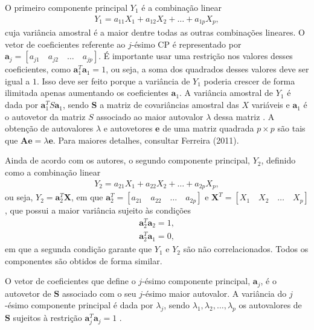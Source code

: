 \documentclass[12pt,a4paper]{article}
\begin{document}
O primeiro componente principal $Y_1$ é a combinação linear
\begin{align*}
	Y_1 = a_{11}X_1 + a_{12}X_2 + \dots + a_{1p}X_p,
\end{align*}
cuja variância amostral é a maior dentre todas as outras combinações lineares. O vetor de coeficientes referente ao $j$-ésimo CP é representado por $\boldsymbol{a}_j= [a_{j1} \quad a_{j2} \quad \dots \quad a_{jp}]$. É importante usar uma restrição nos valores desses coeficientes, como $\boldsymbol{a}_1^T\boldsymbol{a}_1 = 1$, ou seja, a soma dos quadrados desses valores deve ser igual a $1$. Isso deve ser feito porque a variância de $Y_1$ poderia crescer de forma ilimitada apenas aumentando os coeficientes $\boldsymbol{a}_1$. A variância amostral de $Y_1$ é dada por $\boldsymbol{a}_1^T S\boldsymbol{a}_1$, sendo $\boldsymbol{S}$ a matriz de covariâncias amostral das $X$ variáveis e $\boldsymbol{a}_1$ é o autovetor da matriz $S$ associado ao maior autovalor $\lambda$ dessa matriz \cite{everitt11}. A obtenção de autovalores $\lambda$ e autovetores $\boldsymbol{e}$ de uma matriz quadrada $p \times p$ são tais que $\boldsymbol{A}\boldsymbol{e} = \lambda\boldsymbol{e}$. Para maiores detalhes, consultar Ferreira (2011).
	
Ainda de acordo com os autores, o segundo componente principal, $Y_2$, definido como a combinação linear
\begin{align*}
	Y_2 = a_{21}X_1 + a_{22}X_2 + \dots + a_{2p}X_p,
\end{align*}
ou seja, $Y_2 = \boldsymbol{a}_2^T\boldsymbol{X}$, em que $\boldsymbol{a}_2^T = [a_{21} \quad a_{22} \quad \dots \quad a_{2p}]$ e $\boldsymbol{X}^T = [X_{1} \quad X_{2} \quad \dots \quad X_{p}]$, que possui a maior variância sujeito às condições
\begin{align*}
	\boldsymbol{a}_2^T\boldsymbol{a}_2 = 1,\\
	\boldsymbol{a}_2^T\boldsymbol{a}_1 = 0,
\end{align*}
em que a segunda condição garante que $Y_1$ e $Y_2$ são não correlacionados. Todos os componentes são obtidos de forma similar.
	
O vetor de coeficientes que define o $j$-ésimo componente principal, $\boldsymbol{a}_j$, é o autovetor de $\boldsymbol{S}$ associado com o seu $j$-ésimo maior autovalor. A variância do $j$-ésimo componente principal é dada por $\lambda_j$, sendo  $\lambda_1, \lambda_2, \dots, \lambda_p$ os autovalores de $\boldsymbol{S}$ sujeitos à restrição $\boldsymbol{a}_j^T\boldsymbol{a}_j = 1$ \cite{everitt11}.
	
\end{document}
